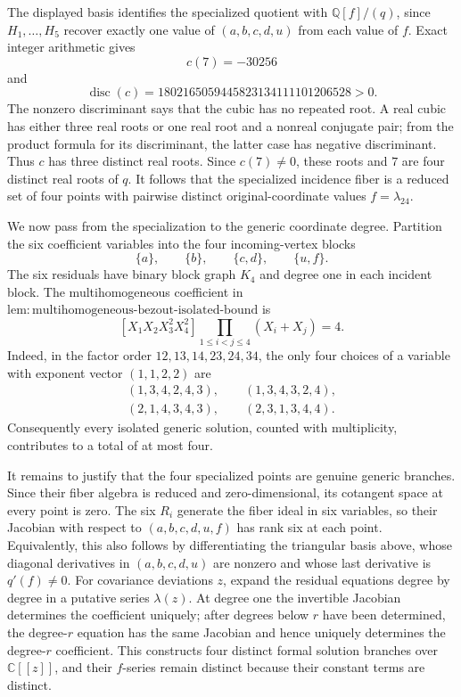 The displayed basis identifies the specialized quotient with \(\mathbb Q[f]/(q)\), since \(H_1,\ldots,H_5\) recover exactly one value of \((a,b,c,d,u)\) from each value of \(f\). Exact integer arithmetic gives
\[
c(7)=-30256
\]
and
\[
\operatorname{disc}(c)
=1802165059445823134111101206528>0.
\]
The nonzero discriminant says that the cubic has no repeated root. A real cubic has either three real roots or one real root and a nonreal conjugate pair; from the product formula for its discriminant, the latter case has negative discriminant. Thus \(c\) has three distinct real roots. Since \(c(7)\ne0\), these roots and \(7\) are four distinct real roots of \(q\). It follows that the specialized incidence fiber is a reduced set of four points with pairwise distinct original-coordinate values \(f=\lambda_{24}\).

We now pass from the specialization to the generic coordinate degree. Partition the six coefficient variables into the four incoming-vertex blocks
\[
\{a\},\qquad\{b\},\qquad\{c,d\},\qquad\{u,f\}.
\]
The six residuals have binary block graph \(K_4\) and degree one in each incident block. The multihomogeneous coefficient in \(\mathrm{lem:multihomogeneous\mbox{-}bezout\mbox{-}isolated\mbox{-}bound}\) is
\[
[X_1X_2X_3^2X_4^2]\prod_{1\le i<j\le4}(X_i+X_j)=4.
\]
Indeed, in the factor order \(12,13,14,23,24,34\), the only four choices of a variable with exponent vector \((1,1,2,2)\) are
\[
\begin{gathered}
(1,3,4,2,4,3),\qquad(1,3,4,3,2,4),\\
(2,1,4,3,4,3),\qquad(2,3,1,3,4,4).
\end{gathered}
\]
Consequently every isolated generic solution, counted with multiplicity, contributes to a total of at most four.

It remains to justify that the four specialized points are genuine generic branches. Since their fiber algebra is reduced and zero-dimensional, its cotangent space at every point is zero. The six \(R_i\) generate the fiber ideal in six variables, so their Jacobian with respect to \((a,b,c,d,u,f)\) has rank six at each point. Equivalently, this also follows by differentiating the triangular basis above, whose diagonal derivatives in \((a,b,c,d,u)\) are nonzero and whose last derivative is \(q'(f)\ne0\). For covariance deviations \(z\), expand the residual equations degree by degree in a putative series \(\lambda(z)\). At degree one the invertible Jacobian determines the coefficient uniquely; after degrees below \(r\) have been determined, the degree-\(r\) equation has the same Jacobian and hence uniquely determines the degree-\(r\) coefficient. This constructs four distinct formal solution branches over \(\mathbb C[[z]]\), and their \(f\)-series remain distinct because their constant terms are distinct.


